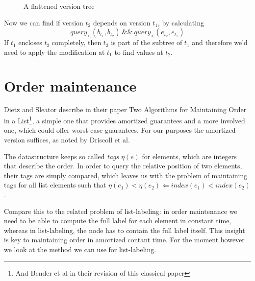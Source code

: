 \documentclass[11pt]{Thesis}
\theoremstyle{definition}
\newcommand{\seclabel}[1]{\label{sec:#1}}
\begin{document}
\begin{figure}[htpb]
  \caption{A flattened version tree}
  \label{fig:flattening-tree}
\end{figure}

Now we can find if version $t_2$ depends on version $t_1$, by calculating 
\[ query_<(b_{t_1}, b_{t_2})\ \mathrm{\&\&}\ query_<(e_{t_2}, e_{t_1})\]
If $t_1$ encloses $t_2$ completely, then $t_2$ is part of the subtree of $t_1$
and therefore we'd need to apply the modification at $t_1$ to find values at
$t_2$.

\section{Order maintenance}\seclabel{order-maintenance}
Dietz and Sleator describe in their paper Two Algorithms for Maintaining 
Order in a List\cite{Diet87b}\footnote{And Bender et al\cite{Bend02a} in 
their revision of this classical paper}, a simple one that provides amortized 
guarantees and a more involved one, which could offer worst-case guarantees. 
For our purposes the amortized version suffices, as noted by Driscoll et
al\cite[p. 108]{Dris89a}.

The datastructure keeps so called \emph{tags} $\eta(e)$ for elements, which are 
integers that describe the order. In order to query the relative position of 
two elements, their tags are simply compared, which leaves us with the 
problem of maintaining tags for all list elements such that 
$\eta(e_1)<\eta(e_2) \Leftarrow index(e_1) < index(e_2)$.

Compare this to the related problem of list-labeling: in order maintenance we 
need to be able to compute the full label for each element in constant time, 
whereas in list-labeling, the node has to contain the full label itself. This 
insight is key to maintaining order in amortized contant time. For the moment 
however we look at the method we can use for list-labeling.
\end{document}
